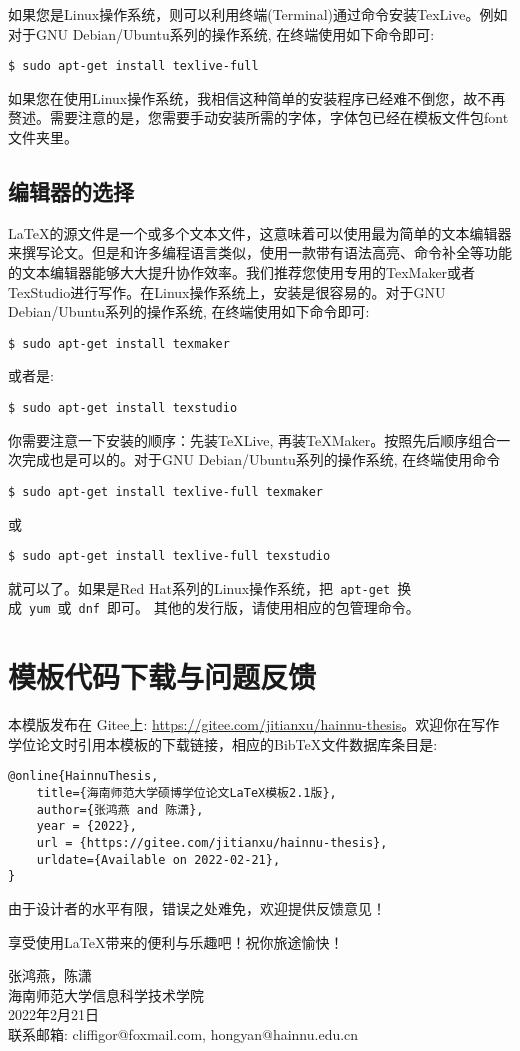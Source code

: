 如果您是Linux操作系统，则可以利用终端(Terminal)通过命令安装TexLive。例如对于GNU Debian/Ubuntu系列的操作系统, 在终端使用如下命令即可:
\begin{lstlisting}[frame=shadowbox]
	$ sudo apt-get install texlive-full
\end{lstlisting}
如果您在使用Linux操作系统，我相信这种简单的安装程序已经难不倒您，故不再赘述。需要注意的是，您需要手动安装所需的字体，字体包已经在模板文件包font文件夹里。

\subsection*{编辑器的选择}
\LaTeX 的源文件是一个或多个文本文件，这意味着可以使用最为简单的文本编辑器来撰写论文。但是和许多编程语言类似，使用一款带有语法高亮、命令补全等功能的文本编辑器能够大大提升协作效率。我们推荐您使用专用的TexMaker或者TexStudio进行写作。在Linux操作系统上，安装是很容易的。对于GNU Debian/Ubuntu系列的操作系统, 在终端使用如下命令即可:
\begin{lstlisting}[frame=shadowbox]
	$ sudo apt-get install texmaker
\end{lstlisting}
或者是:
\begin{lstlisting}[frame=shadowbox]
	$ sudo apt-get install texstudio
\end{lstlisting}
你需要注意一下安装的顺序：先装TeXLive, 再装TeXMaker。按照先后顺序组合一次完成也是可以的。对于GNU Debian/Ubuntu系列的操作系统, 在终端使用命令
\begin{lstlisting}[frame=shadowbox]
	$ sudo apt-get install texlive-full texmaker
\end{lstlisting}
或
\begin{lstlisting}[frame=shadowbox]
	$ sudo apt-get install texlive-full texstudio
\end{lstlisting}
就可以了。如果是Red Hat系列的Linux操作系统，把~\verb|apt-get|~换成~\verb|yum|~或~\verb|dnf|~即可。
其他的发行版，请使用相应的包管理命令。

\newpage

\section*{模板代码下载与问题反馈}

本模版发布在 Gitee上: \url{https://gitee.com/jitianxu/hainnu-thesis}。欢迎你在写作学位论文时引用本模板的下载链接，相应的BibTeX文件数据库条目是:
\begin{verbatim}
@online{HainnuThesis,
	title={海南师范大学硕博学位论文LaTeX模板2.1版},
	author={张鸿燕 and 陈潇},
	year = {2022},
	url = {https://gitee.com/jitianxu/hainnu-thesis},
	urldate={Available on 2022-02-21},	
}
\end{verbatim}

{由于设计者的水平有限，错误之处难免，欢迎提供反馈意见！}

享受使用{\LaTeX{}}带来的便利与乐趣吧！祝你旅途愉快！

\begin{flushright}
	张鸿燕，陈潇\\
	海南师范大学信息科学技术学院\\
	2022年2月21日\\
	联系邮箱: cliffigor@foxmail.com, hongyan@hainnu.edu.cn
\end{flushright}